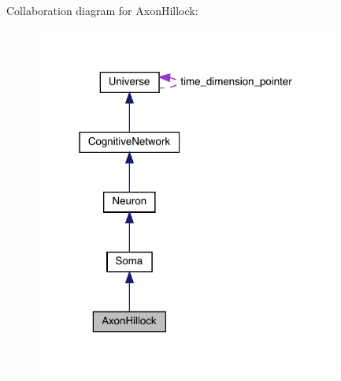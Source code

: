 Collaboration diagram for Axon\+Hillock\+:\nopagebreak
\begin{figure}[H]
\begin{center}
\leavevmode
\includegraphics[width=283pt]{class_axon_hillock__coll__graph}
\end{center}
\end{figure}
